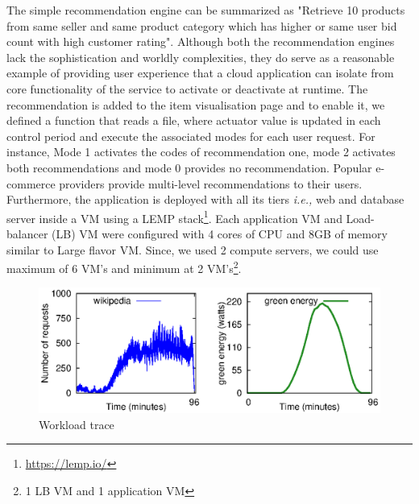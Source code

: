 The
simple recommendation engine can be summarized as "Retrieve 10 products from same seller and same product category which has higher or same user bid count with high customer rating". Although both the
recommendation engines lack the sophistication and worldly complexities, they do
serve as a reasonable example of providing user experience that a cloud
application can isolate from core functionality of the service 
to activate or
deactivate at runtime. The recommendation is added
to the item visualisation page and to enable it, we defined
a function that reads a file, where actuator value is updated
in each control period and execute the associated modes for
each user request. For instance, Mode 1 activates the codes of
recommendation one, mode 2 activates both recommendations
and mode 0 provides no recommendation. Popular e-commerce providers provide multi-level recommendations to their users. Furthermore, the application is deployed with all its tiers \emph{i.e.,} web and database server inside a VM using a LEMP stack\footnote{\url{https://lemp.io/}}. Each application VM and Load-balancer (LB) VM were configured with 4 cores of CPU and 8GB of memory similar to Large flavor VM. Since, we used 2 compute servers, we could use maximum of 6 VM's and minimum at 2 VM's\footnote{1 LB VM and 1 application VM}. 

\begin{figure}[h]
\includegraphics[scale=.65]{Graphs/workload_ucc.eps}
\caption{Workload trace}
\label{fig:workload} 
\end{figure}

